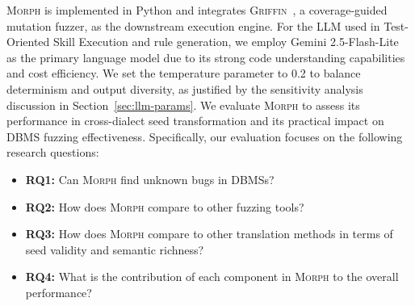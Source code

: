 \documentclass[conference]{IEEEtran}
\newcommand{\tool}{\textsc{Morph}\xspace}
\newcommand{\griffin}{\textsc{Griffin}\xspace}
\begin{document}
\tool{} is implemented in Python and integrates \griffin{}~\cite{fu2022griffin}, a coverage-guided mutation fuzzer, as the downstream execution engine. For the LLM used in Test-Oriented Skill Execution and rule generation, we employ Gemini 2.5-Flash-Lite~\cite{gemini-2.5-flash} as the primary language model due to its strong code understanding capabilities and cost efficiency. We set the temperature parameter to 0.2 to balance determinism and output diversity, as justified by the sensitivity analysis discussion in Section~\ref{sec:llm-params}.
We evaluate \tool{} to assess its performance in cross-dialect seed transformation and its practical impact on DBMS fuzzing effectiveness. Specifically, our evaluation focuses on the following research questions:
\begin{itemize}[leftmargin=*]
\item \textbf{RQ1:} Can \tool{} find unknown bugs in DBMSs?
\item \textbf{RQ2:} How does \tool{} compare to other fuzzing tools?
\item \textbf{RQ3:} How does \tool{} compare to other translation methods in terms of seed validity and semantic richness?
\item \textbf{RQ4:} What is the contribution of each component in \tool{} to the overall performance?
\end{itemize}

\end{document}
